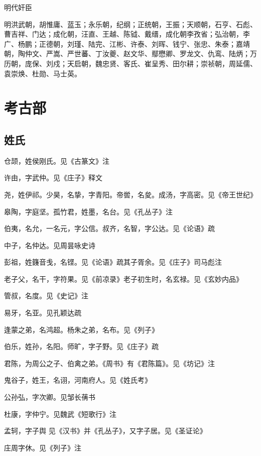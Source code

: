 \documentclass[a4paper,12pt,UTF8,twoside]{ctexbook}
\begin{document}
    明代奸臣
    
    明洪武朝，胡惟庸、蓝玉；永乐朝，纪纲；正统朝，王振；天顺朝，石亨、石彪、曹吉祥、门达；成化朝，汪直、王越、陈钺、戴缙，成化朝李孜省；弘治朝，李广、杨鹏；正德朝，刘瑾、陆完、江彬、许泰、刘晖、钱宁、张忠、朱泰；嘉靖朝，陶仲文、严嵩、严世蕃、丁汝夔、赵文华、鄢懋卿、罗龙文、仇鸾、陆炳；万历朝，庞保、刘戍；天启朝，魏忠贤、客氏、崔呈秀、田尔耕；崇祯朝，周延儒、袁崇焕、杜勋、马士英。
    
 
    
    \part{考古部}
    
    \chapter{姓氏}
    
    仓颉，姓侯刚氏。见《古篆文》注
    
    许由，字武仲。见《庄子》释文
    
    尧，姓伊祁。少昊，名挚，字青阳。帝喾，名夋。成汤，字高密。见《帝王世纪》
    
    皋陶，字庭坚。孤竹君，姓墨，名台。见《孔丛子》注
    
    伯夷，名允，一名元，字公信。叔齐，名智，字公达。见《论语》疏
    
    中子，名仲达。见周昙咏史诗
    
    彭祖，姓籛音戋，名铿。见《论语》疏其子胥余。见《庄子》司马彪注
    
    老子父，名干，字符果。见《前凉录》老子初生时，名玄禄。见《玄妙内品》
    
    管叔，名度。见《史记》注
    
    易牙，名亚。见孔颖达疏
    
    逢蒙之弟，名鸿超。杨朱之弟，名布。见《列子》
    
    伯乐，姓孙，名阳。师旷，字子野。见《庄子》疏
    
    君陈，为周公之子、伯禽之弟。《周书》有《君陈篇》。见《坊记》注
    
    鬼谷子，姓王，名诩，河南府人。见《姓氏考》
    
    公孙弘，字次卿。见邹长蒨书
    
    杜康，字仲宁。见魏武《短歌行》注
    
    孟轲，字子舆 见《汉书》并《孔丛子》，又字子居。见《圣证论》
    
    庄周字休。见《列子》注
    
\end{document}
